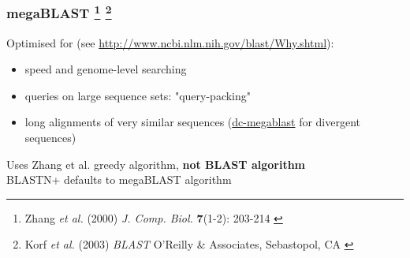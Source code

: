 %
\begin{frame}
  \frametitle{megaBLAST
  \footnote{\tiny{Zhang \textit{et al.} (2000) \textit{J. Comp. Biol.} \textbf{7}(1-2): 203-214
}}
  \footnote{\tiny{Korf \textit{et al.} (2003) \textit{BLAST} O'Reilly \& Associates, Sebastopol, CA
}}
  }
  Optimised for {\small(see \href{http://www.ncbi.nlm.nih.gov/blast/Why.shtml}{http://www.ncbi.nlm.nih.gov/blast/Why.shtml})}:
  \begin{itemize}
    \item \textcolor{hutton_green}{speed and genome-level searching}
    \item \textcolor{hutton_blue}{queries on large sequence sets}: "query-packing"
    \item \textcolor{hutton_purple}{long alignments of very similar sequences} (\url{dc-megablast} for divergent sequences)
  \end{itemize}
  Uses Zhang et al. greedy algorithm, \textbf{not BLAST algorithm} \\
  \textcolor{RawSienna}{BLASTN+ defaults to megaBLAST algorithm}
\end{frame}

